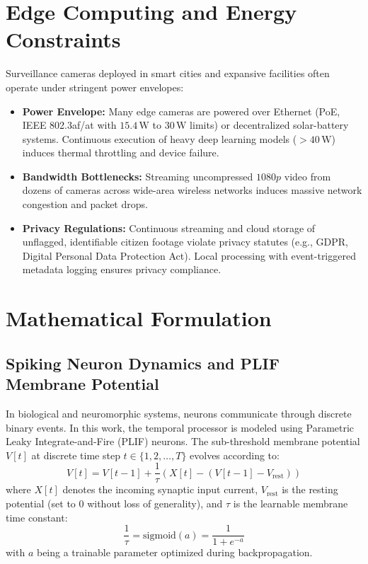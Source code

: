\documentclass[12pt,a4paper]{report}
\begin{document}
\section{Edge Computing and Energy Constraints}
Surveillance cameras deployed in smart cities and expansive facilities often operate under stringent power envelopes:
\begin{itemize}
    \item \textbf{Power Envelope:} Many edge cameras are powered over Ethernet (PoE, IEEE 802.3af/at with $15.4\,\text{W}$ to $30\,\text{W}$ limits) or decentralized solar-battery systems. Continuous execution of heavy deep learning models ($> 40\,\text{W}$) induces thermal throttling and device failure.
    \item \textbf{Bandwidth Bottlenecks:} Streaming uncompressed $1080p$ video from dozens of cameras across wide-area wireless networks induces massive network congestion and packet drops.
    \item \textbf{Privacy Regulations:} Continuous streaming and cloud storage of unflagged, identifiable citizen footage violate privacy statutes (e.g., GDPR, Digital Personal Data Protection Act). Local processing with event-triggered metadata logging ensures privacy compliance.
\end{itemize}

\section{Mathematical Formulation}

\subsection{Spiking Neuron Dynamics and PLIF Membrane Potential}
In biological and neuromorphic systems, neurons communicate through discrete binary events. In this work, the temporal processor is modeled using Parametric Leaky Integrate-and-Fire (PLIF) neurons. The sub-threshold membrane potential $V[t]$ at discrete time step $t \in \{1, 2, \dots, T\}$ evolves according to:
\begin{equation}
    V[t] = V[t-1] + \frac{1}{\tau} \left( X[t] - (V[t-1] - V_{\text{rest}}) \right)
\end{equation}
where $X[t]$ denotes the incoming synaptic input current, $V_{\text{rest}}$ is the resting potential (set to 0 without loss of generality), and $\tau$ is the learnable membrane time constant:
\begin{equation}
    \frac{1}{\tau} = \text{sigmoid}(a) = \frac{1}{1 + e^{-a}}
\end{equation}
with $a$ being a trainable parameter optimized during backpropagation.
\end{document}
